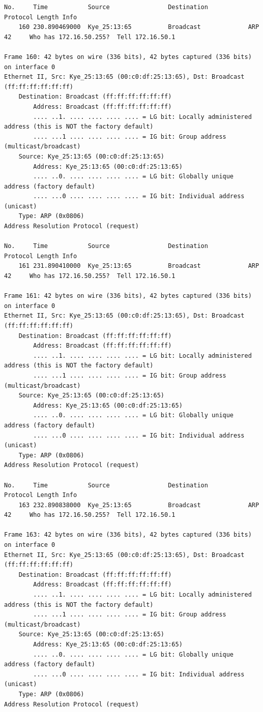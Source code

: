 \documentclass[a4paper,11pt]{article}
\begin{document}
\begin{lstlisting}
No.     Time           Source                Destination           Protocol Length Info
    160 230.890469000  Kye_25:13:65          Broadcast             ARP      42     Who has 172.16.50.255?  Tell 172.16.50.1

Frame 160: 42 bytes on wire (336 bits), 42 bytes captured (336 bits) on interface 0
Ethernet II, Src: Kye_25:13:65 (00:c0:df:25:13:65), Dst: Broadcast (ff:ff:ff:ff:ff:ff)
    Destination: Broadcast (ff:ff:ff:ff:ff:ff)
        Address: Broadcast (ff:ff:ff:ff:ff:ff)
        .... ..1. .... .... .... .... = LG bit: Locally administered address (this is NOT the factory default)
        .... ...1 .... .... .... .... = IG bit: Group address (multicast/broadcast)
    Source: Kye_25:13:65 (00:c0:df:25:13:65)
        Address: Kye_25:13:65 (00:c0:df:25:13:65)
        .... ..0. .... .... .... .... = LG bit: Globally unique address (factory default)
        .... ...0 .... .... .... .... = IG bit: Individual address (unicast)
    Type: ARP (0x0806)
Address Resolution Protocol (request)

No.     Time           Source                Destination           Protocol Length Info
    161 231.890410000  Kye_25:13:65          Broadcast             ARP      42     Who has 172.16.50.255?  Tell 172.16.50.1

Frame 161: 42 bytes on wire (336 bits), 42 bytes captured (336 bits) on interface 0
Ethernet II, Src: Kye_25:13:65 (00:c0:df:25:13:65), Dst: Broadcast (ff:ff:ff:ff:ff:ff)
    Destination: Broadcast (ff:ff:ff:ff:ff:ff)
        Address: Broadcast (ff:ff:ff:ff:ff:ff)
        .... ..1. .... .... .... .... = LG bit: Locally administered address (this is NOT the factory default)
        .... ...1 .... .... .... .... = IG bit: Group address (multicast/broadcast)
    Source: Kye_25:13:65 (00:c0:df:25:13:65)
        Address: Kye_25:13:65 (00:c0:df:25:13:65)
        .... ..0. .... .... .... .... = LG bit: Globally unique address (factory default)
        .... ...0 .... .... .... .... = IG bit: Individual address (unicast)
    Type: ARP (0x0806)
Address Resolution Protocol (request)

No.     Time           Source                Destination           Protocol Length Info
    163 232.890838000  Kye_25:13:65          Broadcast             ARP      42     Who has 172.16.50.255?  Tell 172.16.50.1

Frame 163: 42 bytes on wire (336 bits), 42 bytes captured (336 bits) on interface 0
Ethernet II, Src: Kye_25:13:65 (00:c0:df:25:13:65), Dst: Broadcast (ff:ff:ff:ff:ff:ff)
    Destination: Broadcast (ff:ff:ff:ff:ff:ff)
        Address: Broadcast (ff:ff:ff:ff:ff:ff)
        .... ..1. .... .... .... .... = LG bit: Locally administered address (this is NOT the factory default)
        .... ...1 .... .... .... .... = IG bit: Group address (multicast/broadcast)
    Source: Kye_25:13:65 (00:c0:df:25:13:65)
        Address: Kye_25:13:65 (00:c0:df:25:13:65)
        .... ..0. .... .... .... .... = LG bit: Globally unique address (factory default)
        .... ...0 .... .... .... .... = IG bit: Individual address (unicast)
    Type: ARP (0x0806)
Address Resolution Protocol (request)


\end{lstlisting}
\end{document}
